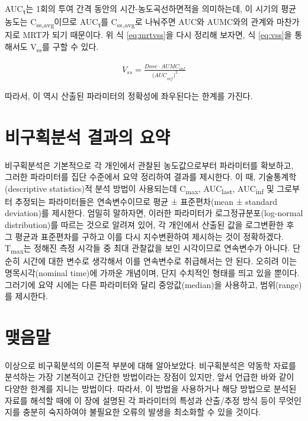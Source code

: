 \documentclass[
  11pt,
  krantz2, a4paper, twoside]{krantz}
\theoremstyle{definition}
\theoremstyle{definition}
\theoremstyle{definition}
\theoremstyle{definition}
\theoremstyle{remark}
\begin{document}
AUC\textsubscript{τ}는 1회의 투여 간격 동안의 시간-농도곡선하면적을 의미하는데, 이 시기의 평균 농도는 C\textsubscript{ss,avg}이므로 AUC\textsubscript{τ}를 C\textsubscript{ss,avg}로 나눠주면 AUC와 AUMC와의 관계와 마찬가지로 MRT가 되기 때문이다.
위 식 \eqref{eq:mrtvss}을 다시 정리해 보자면, 식 \eqref{eq:vss}을 통해서도 V\textsubscript{ss}를 구할 수 있다.

\begin{equation}
\begin{split}
  V_{ss} = \frac{Dose \cdot AUMC_{inf}}{{{(AUC}_{inf})}^2}
\end{split}
\label{eq:vss}
\end{equation}

따라서, 이 역시 산출된 파라미터의 정확성에 좌우된다는 한계를 가진다.

\hypertarget{uxbe44uxad6cuxd68duxbd84uxc11d-uxacb0uxacfcuxc758-uxc694uxc57d}{%
\section{비구획분석 결과의 요약}\label{uxbe44uxad6cuxd68duxbd84uxc11d-uxacb0uxacfcuxc758-uxc694uxc57d}}

비구획분석은 기본적으로 각 개인에서 관찰된 농도값으로부터 파라미터를 확보하고, 그러한 파라미터를 집단 수준에서 요약 정리하여 결과를 제시한다. 이 때, 기술통계학(descriptive statistics)적 분석 방법이 사용되는데 C\textsubscript{max}, AUC\textsubscript{last}, AUC\textsubscript{inf} 및 그로부터 추정되는 파라미터들은 연속변수이므로 평균 ± 표준편차(mean ± standard deviation)를 제시한다. 엄밀히 말하자면, 이러한 파라미터가 로그정규분포(log-normal distribution)를 따르는 것으로 알려져 있어, 각 개인에서 산출된 값을 로그변환한 후 그 평균과 표준편차를 구하고 이를 다시 지수변환하여 제시하는 것이 정확하겠다. T\textsubscript{max}는 정해진 측정 시각들 중 최대 관찰값을 보인 시각이므로 연속변수가 아니다. 단순히 시간에 대한 변수로 생각해서 이를 연속변수로 취급해서는 안 된다. 오히려 이는 명목시각(nominal time)에 가까운 개념이며, 단지 수치적인 형태를 띄고 있을 뿐이다. 그러기에 요약 시에는 다른 파라미터와 달리 중앙값(median)을 사용하고, 범위(range)를 제시한다.

\hypertarget{uxb9fauxc74cuxb9d0-1}{%
\section{맺음말}\label{uxb9fauxc74cuxb9d0-1}}

이상으로 비구획분석의 이론적 부분에 대해 알아보았다.
비구획분석은 약동학 자료를 분석하는 가장 기본적이고 간단한 방법이라는 장점이 있지만, 앞서 언급한 바와 같이 다양한 한계를 지니는 방법이다. 
따라서, 이 방법을 사용하거나 해당 방법으로 분석된 자료를 해석할 때에 이 장에 설명된 각 파라미터의 특성과 산출/추정 방식 등이 무엇인지를 충분히 숙지하여야 불필요한 오류의 발생을 최소화할 수 있을 것이다.
\end{document}
